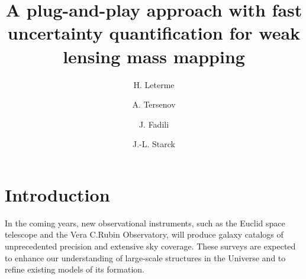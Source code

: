 \documentclass{aa}
\begin{document}
\title{A plug-and-play approach with fast uncertainty quantification for weak lensing mass mapping}

    \author{
            H. Leterme
        \and
            A. Tersenov
        \and
            J. Fadili
        \and
            J.-L. Starck
    }

             

 
\abstract
{}
{}
{}
{}
{}



\maketitle

%




\section{Introduction}
\label{sec:intro}

In the coming years, new observational instruments, such as the Euclid space telescope and the Vera C.\@ Rubin Observatory, will produce galaxy catalogs of unprecedented precision and extensive sky coverage. These surveys are expected to enhance our understanding of large-scale structures in the Universe and to refine existing models of its formation.
\end{document}
